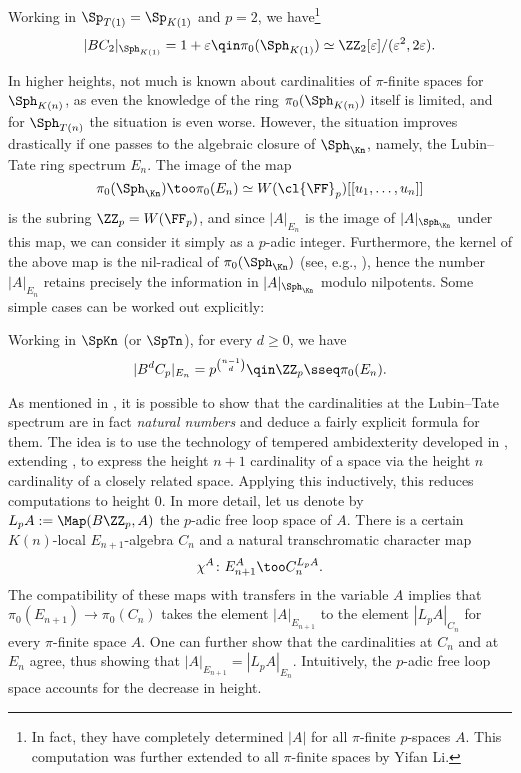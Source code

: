 \documentclass[english]{article}
\begin{document}
\begin{example}\label{CY}
    Working in $\Sp_{T(1)} = \Sp_{K(1)}$ and $p = 2$, we have\footnote{In fact, they have completely determined $|A|$ for all $\pi$-finite $p$-spaces $A$. This computation was further extended to all $\pi$-finite spaces by Yifan Li.}
    \[
        |BC_2|_{\Sph_{K(1)}} = 1 + \varepsilon
        \qin \pi_0(\Sph_{K(1)}) \simeq \ZZ_2[\varepsilon]/(\varepsilon^2, 2\varepsilon).
    \]
\end{example}

In higher heights, not much is known about cardinalities of $\pi$-finite spaces for $\Sph_{K(n)}$, as even the knowledge of the ring $\pi_0(\Sph_{K(n)})$ itself is limited, and for $\Sph_{T(n)}$ the situation is even worse. However, the situation improves drastically if one passes to the algebraic closure of $\Sph_{\Kn}$, namely, the Lubin--Tate ring spectrum $E_n$. The image of the map 
\[
    \pi_0(\Sph_{\Kn}) \too 
    \pi_0(E_n) \simeq
    W(\cl{\FF}_{p})[[u_1,\dots,u_n]]
\]
is the subring $\ZZ_p = W(\FF_p)$, and since $|A|_{E_n}$ is the image of $|A|_{\Sph_{\Kn}}$ under this map, we can consider it simply as a $p$-adic integer. Furthermore, the kernel of the above map is the nil-radical of $\pi_0(\Sph_{\Kn})$ (see, e.g., \cite[Proposition 2.2.6]{AmbiHeight}), hence the number $|A|_{E_n}$ retains precisely the information in $|A|_{\Sph_{\Kn}}$ modulo nilpotents. Some simple cases can be worked out explicitly:

\begin{example}\label{Ex_Card_EM}
    Working in $\SpKn$ (or $\SpTn$), for every $d \ge 0$, we have
    \[
        |B^dC_p|_{E_n} = p^{\binom{n-1}{d}}
        \qin \ZZ_p \sseq \pi_0(E_n).
    \]
\end{example}

As mentioned in \cite[Example 2.2.4]{AmbiHeight}, it is possible to show that the cardinalities at the Lubin--Tate spectrum are in fact \textit{natural numbers} and deduce a fairly explicit formula for them.
The idea is to use the technology of tempered ambidexterity developed in \cite{Lurie_Ell3}, extending \cite{hopkins2000generalized, stapleton2013transchromatic}, to express the height $n+1$ cardinality of a space via the height $n$ cardinality of a closely related space.
Applying this inductively, this reduces computations to height $0$.
In more detail, let us denote by $L_p A := \Map(B\ZZ_p, A)$ the $p$-adic free loop space of $A$. 
There is a certain $K(n)$-local $E_{n+1}$-algebra $C_n$ and a natural transchromatic character map
\[
    \chi^A \colon E_{n+1}^A \too C_n^{L_pA}.
\]
The compatibility of these maps with transfers in the variable $A$ implies that $\pi_0(E_{n+1}) \to \pi_0(C_n)$ takes the element $|A|_{E_{n+1}}$ to the element $|L_pA|_{C_n}$ for every $\pi$-finite space $A$. 
One can further show that the cardinalities at $C_n$ and at $E_n$ agree, thus showing that $|A|_{E_{n+1}} = |L_pA|_{E_n}$. Intuitively, the $p$-adic free loop space accounts for the decrease in height.
\end{document}

